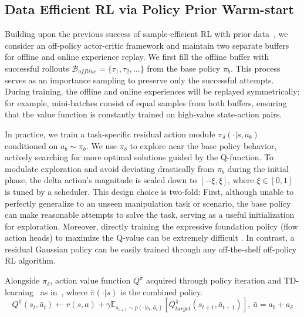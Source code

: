 \subsection{Data Efficient RL via Policy Prior Warm-start}

Building upon the previous success of sample-efficient RL with prior data~\citep{RLPD}, we consider an off-policy actor-critic framework and maintain two separate buffers for offline and online experience replay. We first fill the offline buffer with successful rollouts $\mathcal{B}_{offline} = \{\tau_1, \tau_2, \dots\}$ from the base policy $\pi_{b}$. This process serves as an importance sampling to preserve only the successful attempts. During training, the offline and online experiences will be replayed symmetrically; for example, mini-batches consist of equal samples from both buffers, ensuring that the value function is constantly trained on high-value state-action pairs. 

In practice, we train a task-specific residual action module $\pi_{\delta}(\cdot | s, a_b)$ conditioned on $a_b \sim \pi_b$. We use $\pi_{\delta}$ to explore near the base policy behavior, actively searching for more optimal solutions guided by the Q-function. To modulate exploration and avoid deviating drastically from $\pi_{b}$ during the initial phase, the delta action's magnitude is scaled down to $[-\xi, \xi]$, where $\xi \in [0, 1]$ is tuned by a scheduler. This design choice is two-fold: First, although unable to perfectly generalize to an unseen manipulation task or scenario, the base policy can make reasonable attempts to solve the task, serving as a useful initialization for exploration. Moreover, directly training the expressive foundation policy (\eg flow action heads) to maximize the Q-value can be extremely difficult \citep{mark2024PARL}. In contrast, a residual Gaussian policy can be easily trained through any off-the-shelf off-policy RL algorithm.

Alongside $\pi_{\delta}$, action value function $Q^{\bar{
\pi}}$ acquired through policy iteration and TD-learning~\citep{sutton2018reinforcement} as in~, where $\bar{\pi}(\cdot | s)$ is the combined policy.
\begin{equation}
    \label{eqn: Q def}
    Q^{\bar{\pi}}(s_t, \bar{a}_t) \leftarrow r(s, a) + \gamma \mathbb{E}_{s_{t+1}\sim p(\cdot | s_t, \bar{a}_t)} [Q_{target}^{\bar{\pi}}(s_{t+1}, \bar{a}_{t+1}) ] 
     , \ \bar{a}=a_b+a_\delta
\end{equation}


